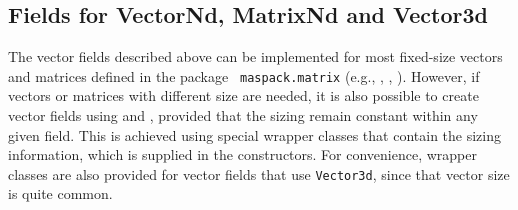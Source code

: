 \subsection{Fields for VectorNd, MatrixNd and Vector3d}
\label{sec:wrapperFields}

The vector fields described above can be implemented for most
fixed-size vectors and matrices defined in the package {\tt
maspack.matrix} (e.g.,
,
,
).
However, if vectors or matrices with different size are needed,
it is also possible to create vector fields using
 and
, provided that the
sizing remain constant within any given field. This is achieved
using special wrapper classes that contain the sizing information,
which is supplied in the constructors. For convenience, wrapper
classes are also provided for vector fields that use {\tt Vector3d},
since that vector size is quite common.

